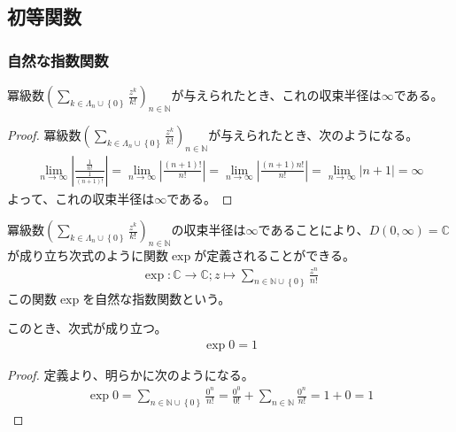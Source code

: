 \documentclass[dvipdfmx]{jsarticle}
\begin{document}
\subsection{初等関数}%
\subsubsection{自然な指数関数}%
\begin{thm}\label{4.3.1.1}
冪級数$\left( \sum_{k \in \varLambda_{n} \cup \left\{ 0 \right\}} \frac{z^{k}}{k!} \right)_{n \in \mathbb{N}}$が与えられたとき、これの収束半径は$\infty$である。
\end{thm}
\begin{proof}
冪級数$\left( \sum_{k \in \varLambda_{n} \cup \left\{ 0 \right\}} \frac{z^{k}}{k!} \right)_{n \in \mathbb{N}}$が与えられたとき、次のようになる。
\begin{align*}
\lim_{n \rightarrow \infty}\left| \frac{\frac{1}{n!}}{\frac{1}{(n + 1)!}} \right| = \lim_{n \rightarrow \infty}\left| \frac{(n + 1)!}{n!} \right| = \lim_{n \rightarrow \infty}\left| \frac{(n + 1)n!}{n!} \right| = \lim_{n \rightarrow \infty}|n + 1| = \infty
\end{align*}
よって、これの収束半径は$\infty$である。
\end{proof}
\begin{dfn}
冪級数$\left( \sum_{k \in \varLambda_{n} \cup \left\{ 0 \right\}} \frac{z^{k}}{k!} \right)_{n \in \mathbb{N}}$の収束半径は$\infty$であることにより、$D(0,\infty) = \mathbb{C}$が成り立ち次式のように関数$\exp$が定義されることができる。
\begin{align*}
\exp:\mathbb{C} \rightarrow \mathbb{C};z \mapsto \sum_{n \in \mathbb{N} \cup \left\{ 0 \right\}} \frac{z^{n}}{n!}
\end{align*}
この関数$\exp$を自然な指数関数という。
\end{dfn}
\begin{thm}\label{4.3.1.2} このとき、次式が成り立つ。
\begin{align*}
\exp 0 = 1
\end{align*}
\end{thm}
\begin{proof} 定義より、明らかに次のようになる。
\begin{align*}
\exp 0 = \sum_{n \in \mathbb{N} \cup \left\{ 0 \right\}} \frac{0^{n}}{n!} = \frac{0^{0}}{0!} + \sum_{n \in \mathbb{N}} \frac{0^{n}}{n!} = 1 + 0 = 1
\end{align*}
\end{proof}
\end{document}
